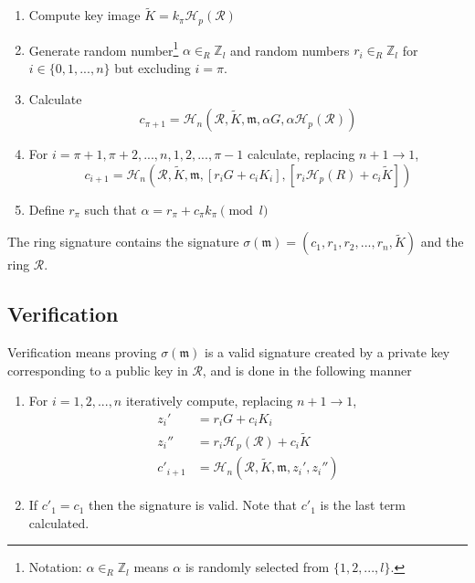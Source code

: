 \begin{enumerate}
	\item Compute key image \(\tilde{K} = k_\pi \mathcal{H}_p(\mathcal{R})\)
	
	\item Generate random number\footnote{\label{notation3_note}Notation: \(\alpha \in_R \mathbb{Z}_l\) means $\alpha$ is randomly selected from \(\{1, 2, ..., l\}\).} \(\alpha \in_R \mathbb{Z}_l\) and random numbers  \(r_i \in_R \mathbb{Z}_l\) for \(i \in \{0, 1, ..., n\}\) but excluding \(i = \pi\).
	
	\item Calculate
	\[c_{\pi+1} = \mathcal{H}_n(\mathcal{R}, \tilde{K}, \mathfrak{m}, \alpha G, \alpha \mathcal{H}_p(\mathcal{R}))\]
	
	\item For \(i = \pi+1, \pi+2, ..., n, 1, 2, ..., \pi-1\) calculate, replacing \(n + 1 \rightarrow 1\),
	\[  c_{i+1} = \mathcal{H}_n(\mathcal{R}, \tilde{K}, \mathfrak{m}, [r_i G + c_i K_i], [r_i \mathcal{H}_p(R) + c_i \tilde{K}])  \] 
	
	
	\item Define $r_\pi$ such that \(\alpha = r_\pi + c_\pi k_\pi \pmod l\)
	
\end{enumerate}

The ring signature contains the signature \(\sigma(\mathfrak{m}) = (c_1, r_1, r_2, ..., r_n, \tilde{K}) \) and the ring $\mathcal{R}$.

\subsection*{Verification}

Verification means proving $\sigma(\mathfrak{m})$ is a valid signature created by a private key corresponding to a public key in $\mathcal{R}$, and is done in the following manner 

\begin{enumerate}
	\item  For \(i = 1, 2, ..., n\) iteratively compute, replacing \(n + 1 \rightarrow 1\),
	\begin{align*}
	z_i'       &= r_i G + c_i {K_i} \\
	z_i''      & = r_i \mathcal{H}_p(\mathcal{R}) + c_i \tilde{K} \\
	c'_{i+1}   &= \mathcal{H}_n(\mathcal{R}, \tilde{K}, \mathfrak{m}, {z_i}', {z_i}'')
	\end{align*}
	
	\item If \(c'_1 = c_1\) then the signature is valid. Note that $c'_1$ is the last term calculated.
\end{enumerate}





